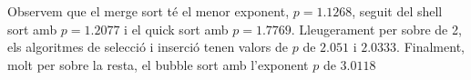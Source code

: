 \noindent
\makebox[\textwidth][c]{
	
}
\vspace*{1em}

Observem que el merge sort té el menor exponent, $p=1.1268$, seguit del shell sort amb $p=1.2077$ i el quick sort amb $p=1.7769$.
Lleugerament per sobre de 2, els algoritmes de selecció i inserció tenen valors de $p$ de $2.051$ i $2.0333$.
Finalment, molt per sobre la resta, el bubble sort amb l'exponent $p$ de $3.0118$

